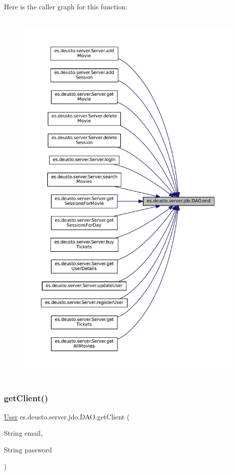 Here is the caller graph for this function\+:
\nopagebreak
\begin{figure}[H]
\begin{center}
\leavevmode
\includegraphics[height=550pt]{classes_1_1deusto_1_1server_1_1jdo_1_1_d_a_o_a376574d8ad006d0bad98e39172b67847_icgraph}
\end{center}
\end{figure}
\mbox{\label{classes_1_1deusto_1_1server_1_1jdo_1_1_d_a_o_a340f51843de8957e9ef8b0c95081512a}} 
\subsubsection{\texorpdfstring{getClient()}{getClient()}}
{\footnotesize\ttfamily \mbox{\hyperlink{classes_1_1deusto_1_1server_1_1jdo_1_1_user}{User}} es.\+deusto.\+server.\+jdo.\+D\+A\+O.\+get\+Client (\begin{DoxyParamCaption}\item[{String}]{email,  }\item[{String}]{password }\end{DoxyParamCaption})}


